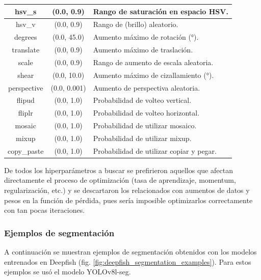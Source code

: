 \begin{table}[htbp]
{\begin{tabular}{|c|c|l|}
\rowcolor[HTML]{D4D4D4} 
hsv\_s & (0.0, 0.9) & Rango de saturación en espacio HSV. \\ \hline
\rowcolor[HTML]{D4D4D4} 
hsv\_v & (0.0, 0.9) & Rango de (brillo) aleatorio. \\ \hline
\rowcolor[HTML]{D4D4D4} 
degrees & (0.0, 45.0) & Aumento máximo de rotación (°). \\ \hline
\rowcolor[HTML]{D4D4D4} 
translate & (0.0, 0.9) & Aumento máximo de traslación. \\ \hline
\rowcolor[HTML]{D4D4D4} 
scale & (0.0, 0.9) & Rango de aumento de escala aleatoria. \\ \hline
\rowcolor[HTML]{D4D4D4} 
shear & (0.0, 10.0) & Aumento máximo de cizallamiento (°). \\ \hline
\rowcolor[HTML]{D4D4D4} 
perspective & (0.0, 0.001) & Aumento de perspectiva aleatoria. \\ \hline
\rowcolor[HTML]{D4D4D4} 
flipud & (0.0, 1.0) & Probabilidad de volteo vertical. \\ \hline
\rowcolor[HTML]{D4D4D4} 
fliplr & (0.0, 1.0) & Probabilidad de volteo horizontal. \\ \hline
\rowcolor[HTML]{D4D4D4} 
mosaic & (0.0, 1.0) & Probabilidad de utilizar mosaico. \\ \hline
\rowcolor[HTML]{D4D4D4} 
mixup & (0.0, 1.0) & Probabilidad de utilizar mixup. \\ \hline
\rowcolor[HTML]{D4D4D4} 
copy\_paste & (0.0, 1.0) & Probabilidad de utilizar copiar y pegar. \\ \hline
\end{tabular}
}
\end{table}

De todos los hiperparámetros a buscar se prefirieron aquellos que afectan directamente el proceso de optimización (tasa de aprendizaje, momentum, regularización, etc.) y se descartaron los relacionados con aumentos de datos y pesos en la función de pérdida, pues sería imposible optimizarlos correctamente con tan pocas iteraciones.

\subsubsection{Ejemplos de segmentación}
A continuación se muestran ejemplos de segmentación obtenidos con los modelos entrenados en Deepfish (fig. \ref{fig:deepfish_segmentation_examples}). Para estos ejemplos se usó el modelo YOLOv8l-seg.

